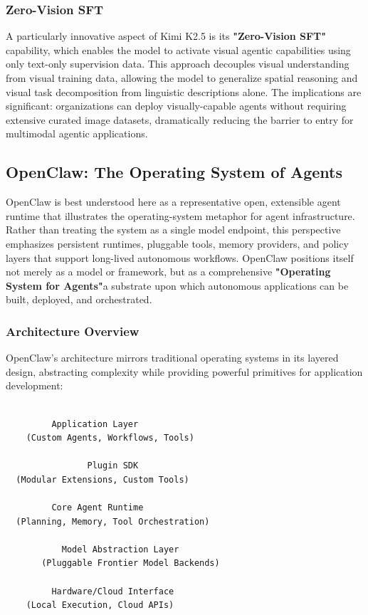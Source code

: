 \subsubsection{Zero-Vision SFT}

A particularly innovative aspect of Kimi K2.5 is its \textbf{"Zero-Vision SFT"} capability, which enables the model to activate visual agentic capabilities using only text-only supervision data. This approach decouples visual understanding from visual training data, allowing the model to generalize spatial reasoning and visual task decomposition from linguistic descriptions alone. The implications are significant: organizations can deploy visually-capable agents without requiring extensive curated image datasets, dramatically reducing the barrier to entry for multimodal agentic applications.

\subsection{OpenClaw: The Operating System of Agents}

OpenClaw is best understood here as a representative open, extensible agent runtime that illustrates the operating-system metaphor for agent infrastructure. Rather than treating the system as a single model endpoint, this perspective emphasizes persistent runtimes, pluggable tools, memory providers, and policy layers that support long-lived autonomous workflows. OpenClaw positions itself not merely as a model or framework, but as a comprehensive \textbf{"Operating System for Agents"}a substrate upon which autonomous applications can be built, deployed, and orchestrated.

\subsubsection{Architecture Overview}

OpenClaw's architecture mirrors traditional operating systems in its layered design, abstracting complexity while providing powerful primitives for application development:

\begin{lstlisting}

         Application Layer               
    (Custom Agents, Workflows, Tools)    

                Plugin SDK                 
  (Modular Extensions, Custom Tools)     

         Core Agent Runtime              
  (Planning, Memory, Tool Orchestration) 

           Model Abstraction Layer         
       (Pluggable Frontier Model Backends)   

         Hardware/Cloud Interface        
    (Local Execution, Cloud APIs)        

\end{lstlisting}

